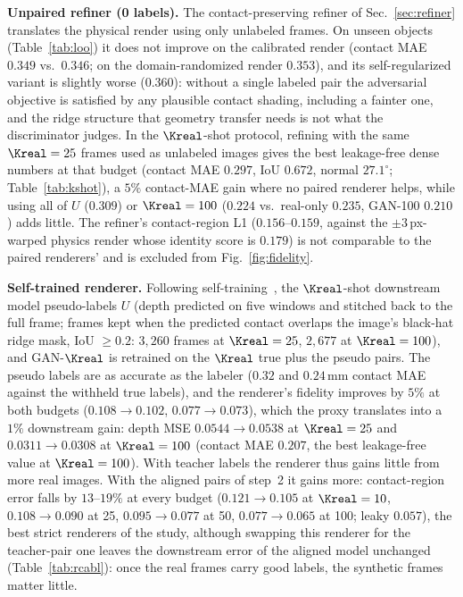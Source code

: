 \noindent\textbf{Unpaired refiner (0 labels).} The contact-preserving refiner of Sec.~\ref{sec:refiner} translates the physical render using only unlabeled frames. On unseen objects (Table~\ref{tab:loo}) it does not improve on the calibrated render (contact MAE $0.349$ vs.\ $0.346$; on the domain-randomized render $0.353$), and its self-regularized variant is slightly worse ($0.360$): without a single labeled pair the adversarial objective is satisfied by any plausible contact shading, including a fainter one, and the ridge structure that geometry transfer needs is not what the discriminator judges. In the $\Kreal$-shot protocol, refining with the same $\Kreal=25$ frames used as unlabeled images gives the best leakage-free dense numbers at that budget (contact MAE $0.297$, IoU $0.672$, normal $27.1^\circ$; Table~\ref{tab:kshot}), a $5\%$ contact-MAE gain where no paired renderer helps, while using all of $U$ ($0.309$) or $\Kreal=100$ ($0.224$ vs.\ real-only $0.235$, GAN-100 $0.210$) adds little. The refiner's contact-region L1 ($0.156$--$0.159$, against the $\pm3\,$px-warped physics render whose identity score is $0.179$) is not comparable to the paired renderers' and is excluded from Fig.~\ref{fig:fidelity}.

\noindent\textbf{Self-trained renderer.} Following self-training~\cite{lee2013pseudo,xie2020noisy}, the $\Kreal$-shot downstream model pseudo-labels $U$ (depth predicted on five windows and stitched back to the full frame; frames kept when the predicted contact overlaps the image's black-hat ridge mask, IoU $\ge0.2$: $3{,}260$ frames at $\Kreal=25$, $2{,}677$ at $\Kreal=100$), and GAN-$\Kreal$ is retrained on the $\Kreal$ true plus the pseudo pairs. The pseudo labels are as accurate as the labeler ($0.32$ and $0.24\,$mm contact MAE against the withheld true labels), and the renderer's fidelity improves by $5\%$ at both budgets ($0.108\!\to\!0.102$, $0.077\!\to\!0.073$), which the proxy translates into a $1\%$ downstream gain: depth MSE $0.0544\!\to\!0.0538$ at $\Kreal=25$ and $0.0311\!\to\!0.0308$ at $\Kreal=100$ (contact MAE $0.207$, the best leakage-free value at $\Kreal=100$). With teacher labels the renderer thus gains little from more real images. With the aligned pairs of step~2 it gains more: contact-region error falls by $13$--$19\%$ at every budget ($0.121\!\to\!0.105$ at $\Kreal=10$, $0.108\!\to\!0.090$ at 25, $0.095\!\to\!0.077$ at 50, $0.077\!\to\!0.065$ at 100; leaky $0.057$), the best strict renderers of the study, although swapping this renderer for the teacher-pair one leaves the downstream error of the aligned model unchanged (Table~\ref{tab:rcabl}): once the real frames carry good labels, the synthetic frames matter little.

